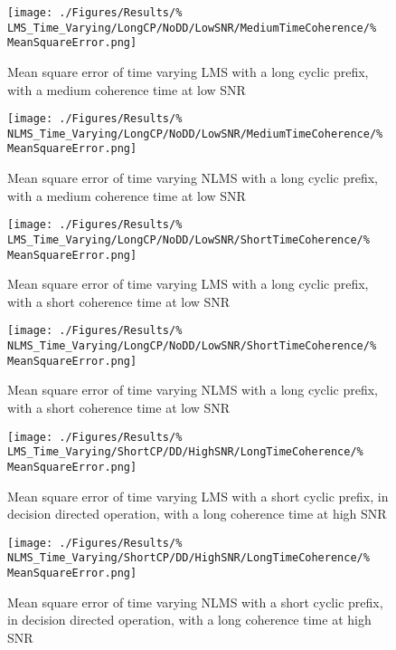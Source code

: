 \begin{figure}[ht]
	\centering
	\begin{minipage}{0.49\textwidth}
		\centering
		\texttt{[image: ./Figures/Results/\%
	LMS\_Time\_Varying/LongCP/NoDD/LowSNR/MediumTimeCoherence/\%
	MeanSquareError.png]}
		\captionsetup{width=0.75\linewidth}
		\caption{Mean square error of time varying LMS with a 
		long cyclic prefix, with a medium coherence time at 
		low SNR}
	\end{minipage}
	\begin{minipage}{0.49\textwidth}
		\centering
		\texttt{[image: ./Figures/Results/\%
	NLMS\_Time\_Varying/LongCP/NoDD/LowSNR/MediumTimeCoherence/\%
	MeanSquareError.png]}
		\captionsetup{width=0.75\linewidth}
		\caption{Mean square error of time varying NLMS with 
		a long cyclic prefix, with a medium coherence time 
		at low SNR}
	\end{minipage}
\end{figure}

\begin{figure}[ht]
	\centering
	\begin{minipage}{0.49\textwidth}
		\centering
		\texttt{[image: ./Figures/Results/\%
	LMS\_Time\_Varying/LongCP/NoDD/LowSNR/ShortTimeCoherence/\%
	MeanSquareError.png]}
		\captionsetup{width=0.75\linewidth}
		\caption{Mean square error of time varying LMS with a 
		long cyclic prefix, with a short coherence time at 
		low SNR}
	\end{minipage}
	\begin{minipage}{0.49\textwidth}
		\centering
		\texttt{[image: ./Figures/Results/\%
	NLMS\_Time\_Varying/LongCP/NoDD/LowSNR/ShortTimeCoherence/\%
	MeanSquareError.png]}
		\captionsetup{width=0.75\linewidth}
		\caption{Mean square error of time varying NLMS with 
		a long cyclic prefix, with a short coherence time at 
		low SNR}
	\end{minipage}
\end{figure}

\begin{figure}[ht]
	\centering
	\begin{minipage}{0.49\textwidth}
		\centering
		\texttt{[image: ./Figures/Results/\%
	LMS\_Time\_Varying/ShortCP/DD/HighSNR/LongTimeCoherence/\%
	MeanSquareError.png]}
		\captionsetup{width=0.75\linewidth}
		\caption{Mean square error of time varying LMS with a 
		short cyclic prefix, in decision directed operation, 
		with a long coherence time at high SNR}
	\end{minipage}
	\begin{minipage}{0.49\textwidth}
		\centering
		\texttt{[image: ./Figures/Results/\%
	NLMS\_Time\_Varying/ShortCP/DD/HighSNR/LongTimeCoherence/\%
	MeanSquareError.png]}
		\captionsetup{width=0.75\linewidth}
		\caption{Mean square error of time varying NLMS with 
		a short cyclic prefix, in decision directed 
		operation, with a long coherence time at high SNR}
	\end{minipage}
\end{figure}

